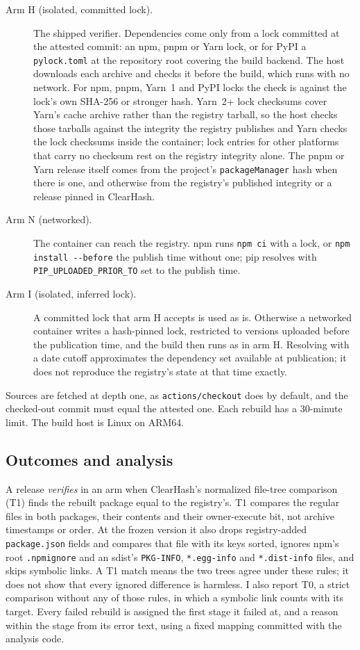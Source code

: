 \documentclass[11pt]{article}
\begin{document}
\begin{description}
\item[Arm H (isolated, committed lock).] The shipped verifier.
Dependencies come only from a lock committed at the attested commit: an
npm, pnpm or Yarn lock, or for PyPI a \texttt{pylock.toml}
\cite{pylock} at the repository root covering the build backend. The
host downloads each archive and checks it before the build, which runs
with no network. For npm, pnpm, Yarn~1 and PyPI locks the check is
against the lock's own SHA-256 or stronger hash. Yarn~2+ lock checksums
cover Yarn's cache archive rather than the registry tarball, so the host
checks those tarballs against the integrity the registry publishes and
Yarn checks the lock checksums inside the container; lock entries for
other platforms that carry no checksum rest on the registry integrity
alone. The pnpm or Yarn release itself comes from the project's
\texttt{packageManager} hash when there is one, and otherwise from the
registry's published integrity or a release pinned in ClearHash.
\item[Arm N (networked).] The container can reach the registry. npm runs
\texttt{npm ci} with a lock, or \texttt{npm install -{}-before} the
publish time without one; pip resolves with
\texttt{PIP\_UPLOADED\_PRIOR\_TO} set to the publish time.
\item[Arm I (isolated, inferred lock).] A committed lock that arm H
accepts is used as is. Otherwise a networked container writes a
hash-pinned lock, restricted to versions uploaded before the publication
time, and the build then runs as in arm H. Resolving with a date cutoff
approximates the dependency set available at publication; it does not
reproduce the registry's state at that time exactly.
\end{description}

Sources are fetched at depth one, as \texttt{actions/checkout} does by
default, and the checked-out commit must equal the attested one. Each
rebuild has a 30-minute limit. The build host is Linux on ARM64.

\subsection{Outcomes and analysis}

A release \emph{verifies} in an arm when ClearHash's normalized file-tree
comparison (T1) finds the rebuilt package equal to the registry's. T1
compares the regular files in both packages, their contents and their
owner-execute bit, not archive timestamps or order. At the frozen
version it also drops registry-added \texttt{package.json} fields and
compares that file with its keys sorted, ignores npm's root
\texttt{.npmignore} and an sdist's \texttt{PKG-INFO},
\texttt{*.egg-info} and \texttt{*.dist-info} files, and skips symbolic
links. A T1 match means the two trees agree under these rules; it does
not show that every ignored difference is harmless. I also report T0, a
strict comparison without any of those rules, in which a symbolic link
counts with its target. Every failed
rebuild is assigned the first stage it failed at, and a reason within the
stage from its error text, using a fixed mapping committed with the
analysis code.
\end{document}

